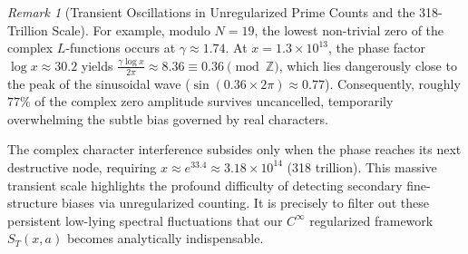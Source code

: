 \documentclass[12pt,reqno]{amsart}
\theoremstyle{definition}
\theoremstyle{remark}
\newtheorem{remark}[theorem]{Remark}
\numberwithin{equation}{section}
\begin{document}
\begin{remark}[Transient Oscillations in Unregularized Prime Counts and the 318-Trillion Scale]
For example, modulo $N=19$, the lowest non-trivial zero of the complex $L$-functions occurs at $\gamma \approx 1.74$. At $x = 1.3 \times 10^{13}$, the phase factor $\log x \approx 30.2$ yields $\frac{\gamma \log x}{2\pi} \approx 8.36 \equiv 0.36 \pmod {\mathbb{Z}}$, which lies dangerously close to the peak of the sinusoidal wave ($\sin(0.36 \times 2\pi) \approx 0.77$). Consequently, roughly $77\%$ of the complex zero amplitude survives uncancelled, temporarily overwhelming the subtle bias governed by real characters.

The complex character interference subsides only when the phase reaches its next destructive node, requiring $x \approx e^{33.4} \approx 3.18 \times 10^{14}$ (318 trillion). This massive transient scale highlights the profound difficulty of detecting secondary fine-structure biases via unregularized counting. It is precisely to filter out these persistent low-lying spectral fluctuations that our $C^\infty$ regularized framework $S_T(x, a)$ becomes analytically indispensable.
\end{remark}
\end{document}
